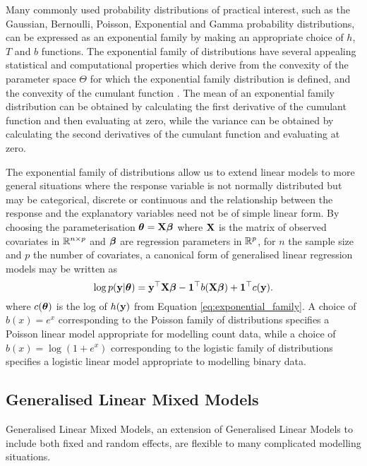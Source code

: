 Many commonly used probability distributions of practical interest, such as the
Gaussian, Bernoulli, Poisson, Exponential and Gamma probability distributions,
can be expressed as an exponential family by making an appropriate choice of
$h$, $T$ and $b$ functions. The exponential family of distributions have several
appealing statistical and computational properties which derive from the
convexity of the parameter space $\Theta$ for which the exponential family
distribution is defined, and the convexity of the cumulant function
\cite{Jordan2010}. The mean of an exponential family distribution can be
obtained by calculating the first derivative of the cumulant function and then
evaluating at zero, while the variance can be obtained by calculating the second
derivatives of the cumulant function and evaluating at zero.

The exponential family of distributions allow us to extend linear models to more
general situations where the response variable is not normally distributed but
may be categorical, discrete or continuous and the relationship between the
response and the explanatory variables need not be of simple linear form.  By
choosing the parameterisation ${\boldsymbol \theta} = {\bf X} {\boldsymbol \beta}$ where ${\bf X}$ is the matrix
of observed covariates in ${\mathbb{R}}^{n \times p}$ and ${\boldsymbol \beta}$ are regression
parameters in ${\mathbb{R}}^p$, for $n$ the sample size and $p$ the number of covariates,
a canonical form of generalised linear regression models may be written as
\begin{equation}\label{eq:glm}
	\log p({\bf y} | {\boldsymbol \theta}) = {\bf y}^\top {\bf X} {\boldsymbol\beta} - {\bf 1}^\top b({\bf X} {\boldsymbol \beta}) + {\bf 1}^\top c({\bf y}).
\end{equation}
where $c({\boldsymbol \theta})$ is the log of $h({\bf y})$ from Equation
\ref{eq:exponential_family}. A choice of $b(x) = e^x$ corresponding to the
Poisson family of distributions specifies a Poisson linear model appropriate for
modelling count data, while a choice of $b(x) = \log(1 + e^x)$ corresponding to
the logistic family of distributions specifies a logistic linear model
appropriate to modelling binary data.

\subsection{Generalised Linear Mixed Models}

Generalised Linear Mixed Models, an extension of Generalised Linear Models to
include both fixed and random effects, are flexible to many complicated
modelling situations.

